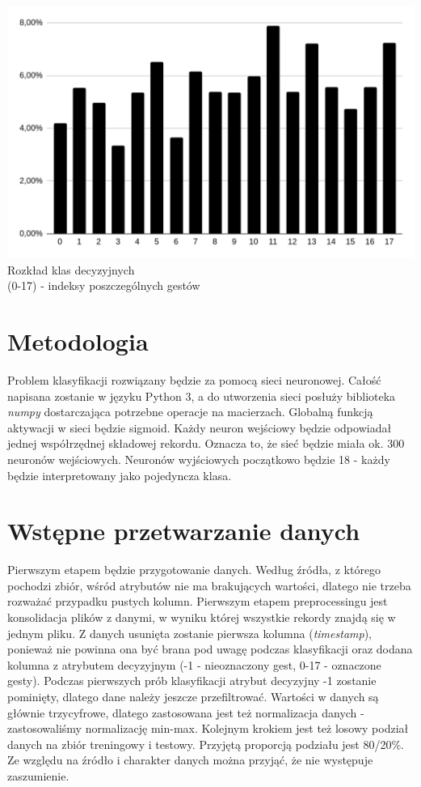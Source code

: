 \documentclass[a4paper,12pt]{article}
\begin{document}
\begin{center}
	\includegraphics[scale=0.25]{rozklad.png}
	\\\small Rozkład klas decyzyjnych
	\\(0-17) - indeksy poszczególnych gestów
\end{center}

\section{Metodologia}
\hspace{1cm}Problem klasyfikacji rozwiązany będzie za pomocą sieci neuronowej. Całość napisana zostanie w języku Python 3, a do utworzenia sieci posłuży biblioteka \textsl{numpy} dostarczająca potrzebne operacje na macierzach. Globalną funkcją aktywacji w sieci będzie sigmoid. Każdy neuron wejściowy będzie odpowiadał jednej współrzędnej składowej rekordu. Oznacza to, że sieć będzie miała ok. 300 neuronów wejściowych. Neuronów wyjściowych początkowo będzie 18 - każdy będzie interpretowany jako pojedyncza klasa.

\section{Wstępne przetwarzanie danych}
\hspace{1cm}Pierwszym etapem będzie przygotowanie danych. Według źródła, z którego pochodzi zbiór, wśród atrybutów nie ma brakujących wartości, dlatego nie trzeba rozważać przypadku pustych kolumn. Pierwszym etapem preprocessingu jest konsolidacja plików z danymi, w wyniku której wszystkie rekordy znajdą się w jednym pliku. Z danych usunięta zostanie pierwsza kolumna (\textsl{timestamp}), ponieważ nie powinna ona być brana pod uwagę podczas klasyfikacji oraz dodana kolumna z atrybutem decyzyjnym (-1 - nieoznaczony gest, 0-17 - oznaczone gesty). Podczas pierwszych prób klasyfikacji atrybut decyzyjny -1 zostanie pominięty, dlatego dane należy jeszcze przefiltrować. Wartości w danych są głównie trzycyfrowe, dlatego zastosowana jest też normalizacja danych - zastosowaliśmy normalizację min-max. Kolejnym krokiem jest też losowy podział danych na zbiór treningowy i testowy. Przyjętą proporcją podziału jest 80/20\%. Ze względu na źródło i charakter danych można przyjąć, że nie występuje zaszumienie.
\end{document}
